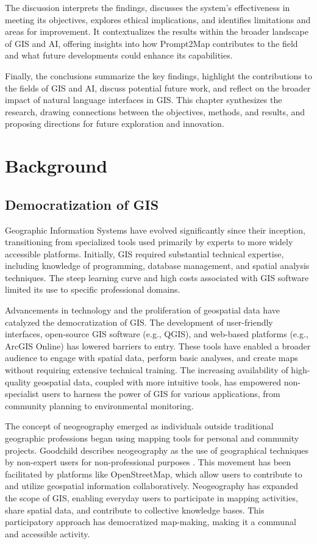 The discussion interprets the findings, discusses the system's effectiveness in meeting its objectives, explores ethical implications, and identifies limitations and areas for improvement. It contextualizes the results within the broader landscape of GIS and AI, offering insights into how Prompt2Map contributes to the field and what future developments could enhance its capabilities.

Finally, the conclusions summarize the key findings, highlight the contributions to the fields of GIS and AI, discuss potential future work, and reflect on the broader impact of natural language interfaces in GIS. This chapter synthesizes the research, drawing connections between the objectives, methods, and results, and proposing directions for future exploration and innovation.

\section{Background}

\subsection{Democratization of GIS}

Geographic Information Systems have evolved significantly since their inception, transitioning from specialized tools used primarily by experts to more widely accessible platforms. Initially, GIS required substantial technical expertise, including knowledge of programming, database management, and spatial analysis techniques. The steep learning curve and high costs associated with GIS software limited its use to specific professional domains.

Advancements in technology and the proliferation of geospatial data have catalyzed the democratization of GIS. The development of user-friendly interfaces, open-source GIS software (e.g., QGIS), and web-based platforms (e.g., ArcGIS Online) has lowered barriers to entry. These tools have enabled a broader audience to engage with spatial data, perform basic analyses, and create maps without requiring extensive technical training. The increasing availability of high-quality geospatial data, coupled with more intuitive tools, has empowered non-specialist users to harness the power of GIS for various applications, from community planning to environmental monitoring.

The concept of neogeography emerged as individuals outside traditional geographic professions began using mapping tools for personal and community projects. Goodchild describes neogeography as the use of geographical techniques by non-expert users for non-professional purposes \cite{goodchild_neogeography_2009}. This movement has been facilitated by platforms like  OpenStreetMap, which allow users to contribute to and utilize geospatial information collaboratively. Neogeography has expanded the scope of GIS, enabling everyday users to participate in mapping activities, share spatial data, and contribute to collective knowledge bases. This participatory approach has democratized map-making, making it a communal and accessible activity.

